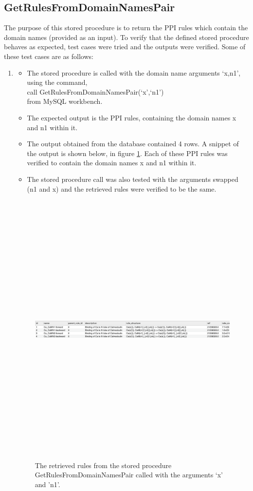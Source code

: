 \documentclass[msc,deptreport,ai]{infthesis}      %
\begin{document}
\subsection{GetRulesFromDomainNamesPair}
The purpose of this stored procedure is to return the PPI rules which contain the domain  names (provided as an input). To verify that the defined stored procedure behaves as expected, test cases were tried and the outputs were verified. Some of these test cases are as follows: 
\begin{enumerate}
	\item 
	\begin{itemize}
		\item 	The stored procedure is called with the domain name arguments `x,n1', using the command, \\
		call GetRulesFromDomainNamesPair(`x',`n1')\\
		from MySQL workbench. 
		\item The expected output is the PPI rules, containing the domain names x and n1 within it.
		\item The output obtained from the database contained 4 rows. A snippet of the output is shown below, in figure \ref{fig:DomainNameOutput1}. Each of these PPI rules was verified to contain the domain names x and n1 within it.
		\item The stored procedure call was also tested with the arguments swapped (n1 and x) and the retrieved rules were verified to be the same.		
	\end{itemize}
	\begin{figure}[H]
		\centering
		\captionsetup{justification=centering}
		\includegraphics[width=\linewidth,height=14cm,keepaspectratio]{DomainNameOutput1.png}	
		\caption{The retrieved rules from the stored procedure GetRulesFromDomainNamesPair called with the arguments `x' and 'n1'.}
		\label{fig:DomainNameOutput1}		
	\end{figure}


\end{enumerate}
\end{document}
